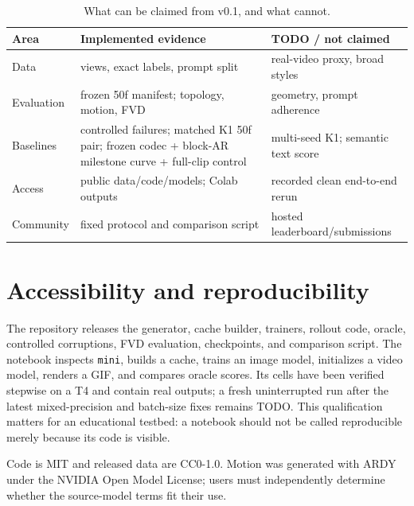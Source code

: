 \documentclass[10pt,twocolumn]{article}
\begin{document}
\begin{table}[t]\centering\caption{What can be claimed from v0.1, and what cannot.}\label{tab:status}\scriptsize
\begin{tabular}{@{}>{\raggedright\arraybackslash}p{}>{\raggedright\arraybackslash}p{}>{\raggedright\arraybackslash}p{}@{}}\toprule
Area & Implemented evidence & TODO / not claimed \\\midrule
Data & 3 views, exact labels, prompt split & real-video proxy, broad styles \\
Evaluation & frozen 50f manifest; topology, motion, FVD & geometry, prompt adherence \\
Baselines & controlled failures; matched K1 50f pair; frozen codec + block-AR milestone curve + full-clip control & multi-seed K1; semantic text score \\
Access & public data/code/models; Colab outputs & recorded clean end-to-end rerun \\
Community & fixed protocol and comparison script & hosted leaderboard/submissions \\\bottomrule
\end{tabular}\end{table}

\section{Accessibility and reproducibility}
The repository releases the generator, cache builder, trainers, rollout code, oracle, controlled corruptions, FVD
evaluation, checkpoints, and comparison script. The notebook inspects \texttt{mini}, builds a cache, trains an image
model, initializes a video model, renders a GIF, and compares oracle scores. Its cells have been verified stepwise on a
T4 and contain real outputs; a fresh uninterrupted run after the latest mixed-precision and batch-size fixes remains
TODO. This qualification matters for an educational testbed: a notebook should not be called reproducible merely
because its code is visible.

Code is MIT and released data are CC0-1.0. Motion was generated with ARDY under the NVIDIA Open Model License; users
must independently determine whether the source-model terms fit their use.
\end{document}
